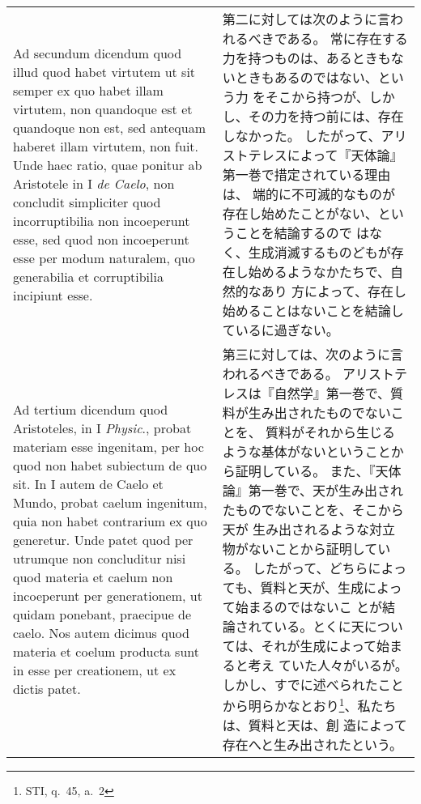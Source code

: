 \documentclass[10pt]{jsarticle} %
\begin{document}
\begin{longtable}{p{21em}p{21em}}
\\



{\sc Ad secundum dicendum} quod illud quod habet virtutem ut sit semper ex quo
 habet illam virtutem, non quandoque est et quandoque non est, sed
 antequam haberet illam virtutem, non fuit. Unde haec ratio, quae
 ponitur ab Aristotele in I {\it de Caelo}, non concludit simpliciter quod
 incorruptibilia non incoeperunt esse, sed quod non incoeperunt esse per
 modum naturalem, quo generabilia et corruptibilia incipiunt esse.

&

第二に対しては次のように言われるべきである。
常に存在する力を持つものは、あるときもないときもあるのではない、という力
 をそこから持つが、しかし、その力を持つ前には、存在しなかった。
したがって、アリストテレスによって『天体論』第一巻で措定されている理由は、
 端的に不可滅的なものが存在し始めたことがない、ということを結論するので
 はなく、生成消滅するものどもが存在し始めるようなかたちで、自然的なあり
 方によって、存在し始めることはないことを結論しているに過ぎない。



\\



{\sc Ad tertium dicendum} quod Aristoteles, in I {\it Physic}., probat materiam esse
 ingenitam, per hoc quod non habet subiectum de quo sit. In I autem {de
 Caelo et Mundo}, probat caelum ingenitum, quia non habet contrarium ex
 quo generetur. Unde patet quod per utrumque non concluditur nisi quod
 materia et caelum non incoeperunt per generationem, ut quidam ponebant,
 praecipue de caelo. Nos autem dicimus quod materia et coelum producta
 sunt in esse per creationem, ut ex dictis patet.

&

第三に対しては、次のように言われるべきである。
アリストテレスは『自然学』第一巻で、質料が生み出されたものでないことを、
 質料がそれから生じるような基体がないということから証明している。
また、『天体論』第一巻で、天が生み出されたものでないことを、そこから天が
 生み出されるような対立物がないことから証明している。
したがって、どちらによっても、質料と天が、生成によって始まるのではないこ
 とが結論されている。とくに天については、それが生成によって始まると考え
 ていた人々がいるが。
しかし、すでに述べられたことから明らかなとおり\footnote{STI, q.~45, a.~2}、私たちは、質料と天は、創
 造によって存在へと生み出されたという。


\\




\end{longtable}
\end{document}
